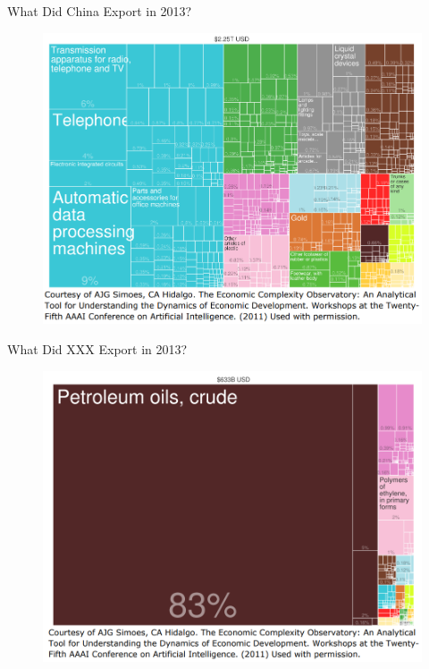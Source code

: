 \documentclass[10pt,hyperref={CJKbookmarks=true},xcolor=dvipsnames,aspectratio=169]{beamer}
\begin{document}
\begin{frame}{What Did China Export in 2013?}


\begin{figure}
\includegraphics[scale=0.35]{fig/gravity/com2-3.PNG}
\end{figure}

\end{frame}

\begin{frame}{What Did XXX Export in 2013?}


\begin{figure}
\includegraphics[scale=0.35]{fig/gravity/com2-4.PNG}
\end{figure}

\end{frame}
\end{document}
